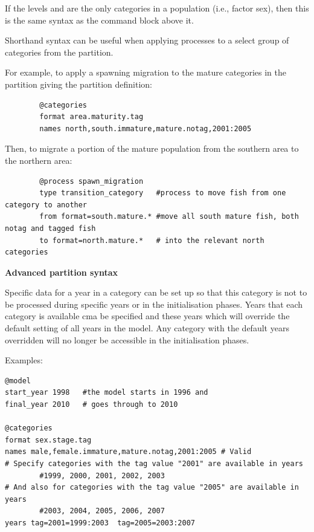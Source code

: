 If the levels  and  are the only categories in a population (i.e., factor sex), then this is the same syntax as the command block above it.

Shorthand syntax can be useful when applying processes to a select group of categories from the partition.

For example, to apply a spawning migration to the mature categories in the partition giving the partition definition:

{\small{\begin{verbatim}
		@categories
		format area.maturity.tag
		names north,south.immature,mature.notag,2001:2005
		\end{verbatim}}}

Then, to migrate a portion of the mature population from the southern area to the northern area:

{\small{\begin{verbatim}
		@process spawn_migration
		type transition_category   #process to move fish from one category to another
		from format=south.mature.* #move all south mature fish, both notag and tagged fish  
		to format=north.mature.*   # into the relevant north categories
		\end{verbatim}}}


\textbf{Advanced partition syntax}

Specific data for a year in a category can be set up so that this category is not to be processed during specific years or in the initialisation phases. Years that each category is available cma be specified and these years which will override the default setting of all years in the model. Any category with the default years overridden will no longer be accessible in the initialisation phases.

Examples:

{\small{\begin{verbatim}
@model
start_year 1998   #the model starts in 1996 and
final_year 2010   # goes through to 2010

@categories
format sex.stage.tag
names male,female.immature,mature.notag,2001:2005 # Valid
# Specify categories with the tag value "2001" are available in years 
        #1999, 2000, 2001, 2002, 2003
# And also for categories with the tag value "2005" are available in years 
        #2003, 2004, 2005, 2006, 2007
years tag=2001=1999:2003  tag=2005=2003:2007
\end{verbatim}}}
\label{sec:ShorthandSyntax-section}

